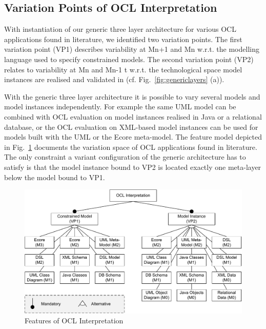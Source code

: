 \subsection{Variation Points of OCL Interpretation}

With instantiation of our generic three layer architecture for various OCL
applications found in literature, we identified
two variation points. The first variation point (VP1) describes variability at Mn+1 and Mn
w.r.t. the modelling language used to specify constrained models. The second variation point (VP2)
relates to variability at Mn and Mn-1 t w.r.t. the technological space
model instances are realised and validated in (cf. Fig.~\ref{fig:genericlayers}
(a)). 

With the generic three layer architecture it is possible to vary several
models and model instances independently. For example the same UML model can be
combined with OCL evaluation on model instances realised in Java or a
relational database, or the OCL evaluation on XML-based model instances can be
used for models built with the UML or the Ecore meta-model. The feature model
depicted in Fig.~\ref{fig:features} documents the variation space of OCL
applications found in literature. The only constraint
a variant configuration of the generic architecture has to
satisfy is that the model instance bound to VP2 is located exactly one
meta-layer below the model bound to VP1. 

  \begin{figure}[t]
			\centering
		  \includegraphics[width=1.00\textwidth]{figures/features.pdf}
			\caption{Features of OCL Interpretation}
			\label{fig:features}
	\end{figure}
	
